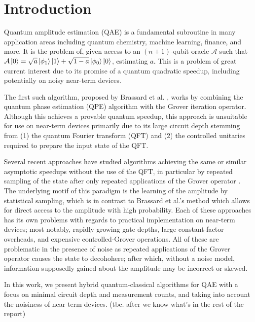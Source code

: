 
\section{Introduction}

Quantum amplitude estimation (QAE) is a fundamental subroutine in many application areas including quantum chemistry, machine learning, finance, and more. It is the problem of, given access to an $(n+1)$-qubit oracle $\mathcal{A}$ such that $\mathcal{A} \ket{0} = \sqrt{a} \ket{\phi_1} \ket{1} + \sqrt{1-a} \ket{\phi_0} \ket{0}$, estimating $a$. This is a problem of great current interest due to its promise of a quantum quadratic speedup, including potentially on noisy near-term devices.

The first such algorithm, proposed by Brassard et al. \cite{Quantum Amplitude Amplification and Estimation}, works by combining the quantum phase estimation (QPE) algorithm \cite{Quantum measurements and the Abelian Stabilizer Problem} with the Grover iteration operator. Although this achieves a provable quantum speedup, this approach is unsuitable for use on near-term devices primarily due to its large circuit depth stemming from (1) the quantum Fourier transform (QFT) \cite{An approximate Fourier transform useful in quantum factoring} and (2) the controlled unitaries required to prepare the input state of the QFT.

Several recent approaches have studied algorithms achieving the same or similar asymptotic speedups without the use of the QFT, in particular by repeated sampling of the state after only repeated applications of the Grover operator \cite{Quantum Approximate Counting Simplified, Amplitude estimation without phase estimation, Simpler Quantum Counting}. The underlying motif of this paradigm is the learning of the amplitude by statistical sampling, which is in contrast to Brassard et al.'s method which allows for direct access to the amplitude with high probability. Each of these approaches has its own problems with regards to practical implementation on near-term devices; most notably, rapidly growing gate depths, large constant-factor overheads, and expensive controlled-Grover operations. All of these are problematic in the presence of noise as repeated applications of the Grover operator causes the state to decohohere; after which, without a noise model, information supposedly gained about the amplitude may be incorrect or skewed.

In this work, we present hybrid quantum-classical algorithms for QAE with a focus on minimal circuit depth and measurement counts, and taking into account the noisiness of near-term devices. {\color{purple} (tbc. after we know what's in the rest of the report)}

